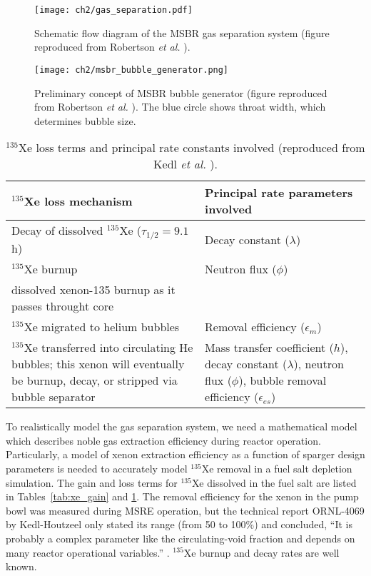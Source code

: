 \begin{figure}[htp!] %
	\centering
	\texttt{[image: ch2/gas\_separation.pdf]}
	\caption{Schematic flow diagram of the \gls{MSBR} gas separation system 
		(figure reproduced from Robertson \emph{et al.} 
		\cite{robertson_conceptual_1971}).}
	\label{fig:gas_removal_system}
\end{figure}
\begin{figure}[htp!] %
	\centering
	\texttt{[image: ch2/msbr\_bubble\_generator.png]}
	\caption{Preliminary concept of \gls{MSBR} bubble generator (figure 
		reproduced from Robertson \emph{et al.} 
		\cite{robertson_conceptual_1971}). 
		The blue circle shows throat width, which determines bubble size.}
	\vspace{-0.25in}
	\label{fig:bubble_separator}
\end{figure}
\begin{table}[b]
	\caption{$^{135}$Xe loss terms and principal rate constants involved
		(reproduced from Kedl \emph{et al.} \cite{kedl_development_1967}).}
	\centering
	\begin{tabularx}{\textwidth}{b b}
		\hline \textbf{$^{135}$Xe loss mechanism}      & \textbf{Principal 
			rate 
			parameters involved}  	\\
		\hline Decay of dissolved $^{135}$Xe ($\tau_{1/2}=9.1$ h)  & Decay 
		constant	($\lambda$)		\\
		\hline $^{135}$Xe burnup              &  Neutron flux 
		($\phi$)		 					\\
		dissolved xenon-135 burnup as it passes throught core  
		& 			            \\		\hline $^{135}$Xe migrated to 
		helium bubbles & Removal efficiency 
		($\epsilon_m$)		\\
		\hline $^{135}$Xe transferred into circulating He bubbles; this xenon 
		will eventually be burnup, decay, or stripped via bubble separator & 
		Mass transfer coefficient ($h$), decay constant ($\lambda$), 
		neutron flux ($\phi$), bubble removal efficiency 
		($\epsilon_{es}$)		\\
		\hline 
	\end{tabularx}
	\label{tab:xe_loss}
\end{table}

To realistically model the gas separation system, we need a mathematical model 
which describes noble gas extraction efficiency during reactor operation. 
Particularly, a model of xenon extraction efficiency as a function of sparger 
design parameters is needed to accurately model $^{135}$Xe removal in a fuel 
salt depletion simulation. The gain and loss terms for $^{135}$Xe dissolved in 
the fuel salt are listed in Tables~\ref{tab:xe_gain} and \ref{tab:xe_loss}. 
The removal efficiency for the xenon in the pump bowl was measured during 
\gls{MSRE} operation, but the technical report ORNL-4069 by Kedl-Houtzeel only 
stated its range (from 50 to 100\%) and concluded, ``It is probably a 
complex parameter like the circulating-void fraction and depends on many 
reactor operational variables.'' \cite{kedl_development_1967}. $^{135}$Xe 
burnup and decay rates are well known. 

